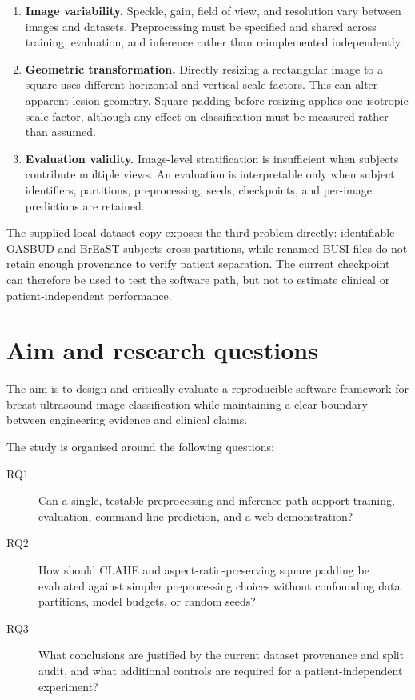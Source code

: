 \begin{enumerate}
    \item \textbf{Image variability.} Speckle, gain, field of view, and resolution vary between images and datasets. Preprocessing must be specified and shared across training, evaluation, and inference rather than reimplemented independently.
    \item \textbf{Geometric transformation.} Directly resizing a rectangular image to a square uses different horizontal and vertical scale factors. This can alter apparent lesion geometry. Square padding before resizing applies one isotropic scale factor, although any effect on classification must be measured rather than assumed.
    \item \textbf{Evaluation validity.} Image-level stratification is insufficient when subjects contribute multiple views. An evaluation is interpretable only when subject identifiers, partitions, preprocessing, seeds, checkpoints, and per-image predictions are retained.
\end{enumerate}

The supplied local dataset copy exposes the third problem directly: identifiable OASBUD and BrEaST subjects cross partitions, while renamed BUSI files do not retain enough provenance to verify patient separation. The current checkpoint can therefore be used to test the software path, but not to estimate clinical or patient-independent performance.

\section{Aim and research questions}
The aim is to design and critically evaluate a reproducible software framework for breast-ultrasound image classification while maintaining a clear boundary between engineering evidence and clinical claims.

The study is organised around the following questions:

\begin{description}
    \item[RQ1] Can a single, testable preprocessing and inference path support training, evaluation, command-line prediction, and a web demonstration?
    \item[RQ2] How should CLAHE and aspect-ratio-preserving square padding be evaluated against simpler preprocessing choices without confounding data partitions, model budgets, or random seeds?
    \item[RQ3] What conclusions are justified by the current dataset provenance and split audit, and what additional controls are required for a patient-independent experiment?
\end{description}

